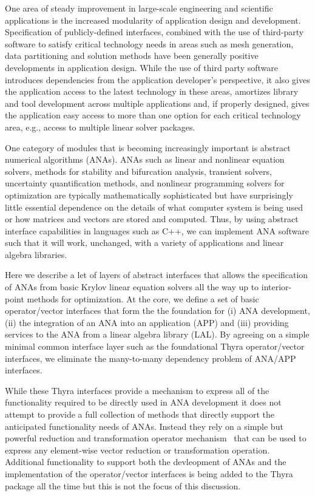 \documentclass[pdf,ps2pdf,11pt]{SANDreport}
\begin{document}
One area of steady improvement in large-scale engineering and
scientific applications is the increased modularity of application
design and development.  Specification of publicly-defined interfaces,
combined with the use of third-party software to satisfy critical
technology needs in areas such as mesh generation, data partitioning
and solution methods have been generally positive developments in
application design.  While the use of third party software introduces
dependencies from the application developer's perspective, it also
gives the application access to the latest technology in these areas,
amortizes library and tool development across multiple applications
and, if properly designed, gives the application easy access to more
than one option for each critical technology area, e.g., access to
multiple linear solver packages.

One category of modules that is becoming increasingly important is abstract
numerical algorithms (ANAs).  ANAs such as linear and nonlinear equation
solvers, methods for stability and bifurcation analysis, transient solvers,
uncertainty quantification methods, and nonlinear programming solvers for
optimization are typically mathematically sophisticated but have surprisingly
little essential dependence on the details of what computer system is being
used or how matrices and vectors are stored and computed.  Thus, by using
abstract interface capabilities in languages such as C++, we can implement ANA
software such that it will work, unchanged, with a variety of applications and
linear algebra libraries.


Here we describe a let of layers of abstract interfaces that allows the
specification of ANAs from basic Krylov linear equation solvers all the way up
to interior-point methods for optimization.  At the core, we define a set of
basic operator/vector interfaces that form the the foundation for (i) ANA
development, (ii) the integration of an ANA into an application (APP) and
(iii) providing services to the ANA from a linear algebra library (LAL).  By
agreeing on a simple minimal common interface layer such as the foundational
Thyra operator/vector interfaces, we eliminate the many-to-many dependency
problem of ANA/APP interfaces.

While these Thyra interfaces provide a mechanism to express all of the
functionality required to be directly used in ANA development it does not
attempt to provide a full collection of methods that directly support the
anticipated functionality needs of ANAs.  Instead they rely on a simple but
powerful reduction and transformation operator mechanism~\cite{ref:rtop_toms}
that can be used to express any element-wise vector reduction or
transformation operation.  Additional functionality to support both the
devleopment of ANAs and the implementation of the operator/vector interfaces
is being added to the Thyra package all the time but this is not the focus of
this discussion.
\end{document}
